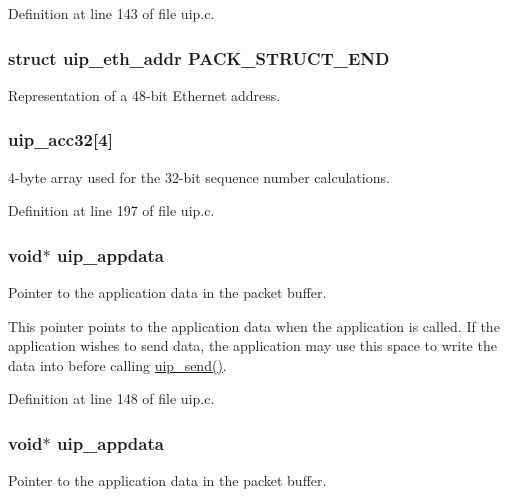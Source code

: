Definition at line 143 of file uip.c.

\hypertarget{group__uip_ga2bd9dfb47fe5347b46dab0c6b93f9b4e}{
\subsubsection[{PACK\_\-STRUCT\_\-END}]{\setlength{\rightskip}{0pt plus 5cm}struct {\bf uip\_\-eth\_\-addr}  {\bf PACK\_\-STRUCT\_\-END}}}
\label{group__uip_ga2bd9dfb47fe5347b46dab0c6b93f9b4e}
Representation of a 48-\/bit Ethernet address. \hypertarget{group__uip_ga2a0cf5d86c58fab216414ce59bf1fea1}{
\subsubsection[{uip\_\-acc32}]{ {\bf uip\_\-acc32}\mbox{[}4\mbox{]}}}
\label{group__uip_ga2a0cf5d86c58fab216414ce59bf1fea1}
4-\/byte array used for the 32-\/bit sequence number calculations. 

Definition at line 197 of file uip.c.

\hypertarget{group__uip_ga561b8eda32e059d4e7397f776268cc63}{
\subsubsection[{uip\_\-appdata}]{\setlength{\rightskip}{0pt plus 5cm}void$\ast$ {\bf uip\_\-appdata}}}
\label{group__uip_ga561b8eda32e059d4e7397f776268cc63}
Pointer to the application data in the packet buffer.

This pointer points to the application data when the application is called. If the application wishes to send data, the application may use this space to write the data into before calling \hyperlink{group__uip_ga04b053a623aac7cd4195157d470661b3}{uip\_\-send()}. 

Definition at line 148 of file uip.c.

\hypertarget{group__uip_ga561b8eda32e059d4e7397f776268cc63}{
\subsubsection[{uip\_\-appdata}]{\setlength{\rightskip}{0pt plus 5cm}void$\ast$ {\bf uip\_\-appdata}}}
\label{group__uip_ga561b8eda32e059d4e7397f776268cc63}
Pointer to the application data in the packet buffer.

